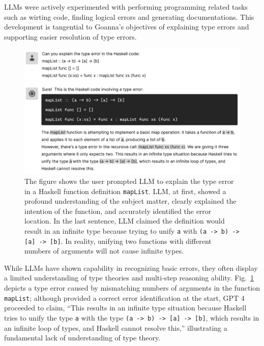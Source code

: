 \documentclass[pdflatex,sn-mathphys-num]{sn-jnl}%
\begin{document}
LLMs were actively experimented with performing programming related tasks such as wirting code, finding logical errors and generating documentations.  This development is tangential to Goanna's objectives of explaining type errors and supporting easier resolution of type errors. 

\begin{figure}[hbt]
  \includegraphics[width=\linewidth]{images/LLM.pdf}
  \caption[LLM explaining a type error; it began very accurate, then went on to give incorrect and contradicting analysis]{\label{fig:llm}
  The figure shows the user prompted LLM to explain the type error in a Haskell function definition \texttt{mapList}. LLM, at first, showed a profound understanding of the subject matter, clearly explained the intention of the function, and accurately identified the error location. In the last sentence, LLM claimed the definition would result in an infinite type because trying to unify \texttt{a} with \texttt{(a -> b) -> [a] -> [b]}. In reality, unifying two functions with different numbers of arguments will not cause infinite types. 
    }
\end{figure}

While LLMs have shown capability in recognizing basic errors, they often display a limited understanding of type theories and multi-step reasoning ability. Fig.~\ref{fig:llm} depicts a type error caused by mismatching numbers of arguments in the function \texttt{mapList}; although provided a correct error identification at the start, GPT 4 proceeded to claim, “This results in an infinite type situation because Haskell tries to unify the type \texttt{a} with the type \texttt{(a -> b) -> [a] -> [b]}, which results in an infinite loop of types, and Haskell cannot resolve this,” illustrating a fundamental lack of understanding of type theory.
\end{document}
